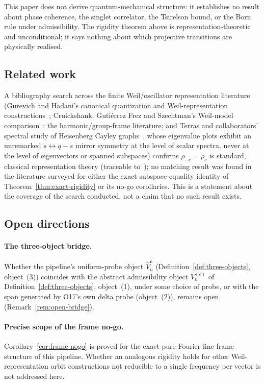 \documentclass[11pt,a4paper]{article}
\begin{document}
  This paper does not derive quantum-mechanical structure: it establishes no result about phase
  coherence, the singlet correlator, the Tsirelson bound, or the Born rule under admissibility. The
  rigidity theorem above is representation-theoretic and unconditional; it says nothing about which
  projective transitions are physically realised.

  \subsection*{Related work}

    A bibliography search across the finite Weil/oscillator representation literature (Gurevich and
    Hadani's canonical quantization and Weil-representation constructions~\cite{GurevichHadani2009};
    Cruickshank, Guti\'errez Frez and Szechtman's Weil-model comparison~\cite{CruickshankSzechtman2020};
    the harmonic/group-frame literature; and Terras and collaborators' spectral study of Heisenberg
    Cayley graphs~\cite{Terras2002heis}, whose eigenvalue plots exhibit an unremarked $s \leftrightarrow
    q-s$ mirror symmetry at the level of scalar spectra, never at the level of eigenvectors or spanned
    subspaces) confirms $\rho_{-c} = \overline{\rho_c}$ is standard, classical representation theory
    (traceable to~\cite{Weil1964}); no matching result was found in the literature surveyed for
    either the exact subspace-equality identity of Theorem~\ref{thm:exact-rigidity} or its no-go
    corollaries. This is a statement about the coverage of the search conducted, not a claim that no
    such result exists.

  \subsection*{Open directions}

    \paragraph{The three-object bridge.}
      Whether the pipeline's uniform-probe object $\widehat V_n^{\mathbf c}$
      (Definition~\ref{def:three-objects}, object~(3)) coincides with the abstract admissibility
      object $V_n^{(c)}$ of Definition~\ref{def:three-objects}, object~(1), under some choice of
      probe, or with the span generated by O17's own delta probe (object~(2)), remains open
      (Remark~\ref{rem:open-bridge}).

    \paragraph{Precise scope of the frame no-go.}
      Corollary~\ref{cor:frame-nogo} is proved for the exact pure-Fourier-line frame structure of
      this pipeline. Whether an analogous rigidity holds for other Weil-representation orbit
      constructions not reducible to a single frequency per vector is not addressed here.
\end{document}
